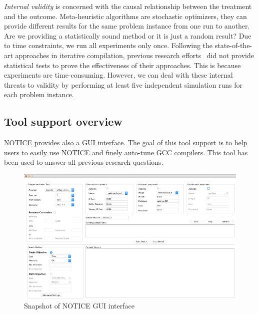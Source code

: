 \textit{Internal validity} is concerned with the causal relationship between the treatment and the outcome. Meta-heuristic algorithms are stochastic optimizers, they can provide different results for the same problem instance from one run to another. Are we providing a statistically sound method or it is just a random result? Due to time constraints, we run all experiments only once. Following the state-of-the-art approaches in iterative compilation, previous research efforts~\cite{hoste2008cole,martinez2014multi} did not provide statistical tests to prove the effectiveness of their approaches. This is because experiments are time-consuming. However, we can deal with these internal threats to validity by performing at least five independent simulation runs for each problem instance. 
		
		
\subsection{Tool support overview}


NOTICE provides also a GUI interface. The goal of this tool support is to help users to easily use NOTICE and finely auto-tune GCC compilers. This tool has been used to answer all previous research questions.

\begin{figure}[h]
	\center
	\includegraphics[scale=0.65]{chapitre3/fig/tool_support}
	\caption{Snapshot of NOTICE GUI interface}
	\label{fig:tool_support}
\end{figure}

